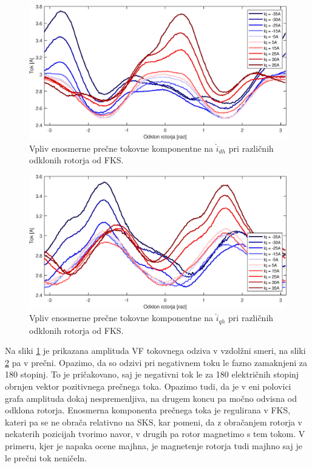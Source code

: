 \documentclass[a4paper,twoside,openright,12pt,slovene]{book}
\begin{document}
\begin{figure}[!htbp]
    \centering
    \includegraphics[width=0.95\columnwidth]{Slike/tokovniOdzivIs_IdAmp.eps}
    \caption{\label{tokovniOdzivIs_IdAmp} Vpliv enosmerne prečne tokovne komponentne na $\hat{i}_{dh}$ pri različnih odklonih rotorja od FKS.}
\end{figure}

\begin{figure}[!htbp]
    \centering
    \includegraphics[width=0.95\columnwidth]{Slike/tokovniOdzivIs_IqAmp.eps}
    \caption{\label{tokovniOdzivIs_IqAmp} Vpliv enosmerne prečne tokovne komponentne na $\hat{i}_{qh}$ pri različnih odklonih rotorja od FKS.}
\end{figure}

Na sliki \ref{tokovniOdzivIs_IdAmp} je prikazana amplituda VF tokovnega odziva v vzdolžni smeri, na sliki \ref{tokovniOdzivIs_IqAmp} pa v prečni. Opazimo, da so odzivi pri negativnem toku le fazno
zamaknjeni za 180 stopinj. To je pričakovano, saj je negativni tok le za 180 električnih stopinj obrnjen vektor pozitivnega prečnega toka. Opazimo tudi, da je v eni polovici grafa amplituda dokaj
nespremenljiva, na drugem koncu pa močno odvisna od odklona rotorja. Enosmerna komponenta prečnega toka je regulirana v FKS, kateri pa se ne obrača relativno na SKS, kar pomeni, da z obračanjem
rotorja v nekaterih pozicijah tvorimo navor, v drugih pa rotor magnetimo s tem tokom. V primeru, kjer je napaka ocene majhna, je magnetenje rotorja tudi majhno saj je le prečni tok neničeln.
\end{document}
